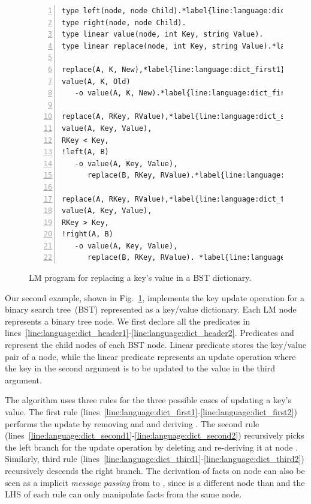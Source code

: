 
\begin{figure}[ht]
\begin{Verbatim}[numbers=left,fontsize=\codesize,commandchars=\*\{\}]
type left(node, node Child).*label{line:language:dict_header1}*hfill // Predicate declaration
type right(node, node Child).
type linear value(node, int Key, string Value).
type linear replace(node, int Key, string Value).*label{line:language:dict_header2}

replace(A, K, New),*label{line:language:dict_first1}*hfill// Rule 1: we found our key
value(A, K, Old)
   -o value(A, K, New).*label{line:language:dict_first2}

replace(A, RKey, RValue),*label{line:language:dict_second1}*hfill// Rule 2: go left
value(A, Key, Value),
RKey < Key,
!left(A, B)
   -o value(A, Key, Value),
      replace(B, RKey, RValue).*label{line:language:dict_second2}

replace(A, RKey, RValue),*label{line:language:dict_third1}*hfill// Rule 3: go right
value(A, Key, Value),
RKey > Key,
!right(A, B)
   -o value(A, Key, Value),
      replace(B, RKey, RValue). *label{line:language:dict_third2}
\end{Verbatim}
\caption{LM program for replacing a key's value in a BST dictionary.}
\label{code:language:btree_replace}
\end{figure}

Our second example, shown in Fig.~\ref{code:language:btree_replace}, implements
the key update operation for a binary search tree~(BST) represented as a
key/value dictionary. Each LM node represents a binary tree node. We first
declare all the predicates in
lines~\ref{line:language:dict_header1}-\ref{line:language:dict_header2}.
Predicates  and  represent the child nodes of each BST
node. Linear predicate  stores the key/value pair of a node, while
the linear predicate  represents an update operation where the key
in the second argument is to be updated to the value in the third argument.

The algorithm uses three rules for the three possible cases of updating a key's
value. The first rule
(lines~\ref{line:language:dict_first1}-\ref{line:language:dict_first2}) performs
the update by removing  and  and
deriving . The second rule
(lines~\ref{line:language:dict_second1}-\ref{line:language:dict_second2})
recursively picks the left branch for the update operation by deleting
 and re-deriving it at node . Similarly,
third rule
(lines~\ref{line:language:dict_third1}-\ref{line:language:dict_third2})
recursively descends the right branch. The derivation of  facts on
node  can also be seen as a implicit \emph{message passing} from
 to , since  is a different node than  and the
LHS of each rule can only manipulate facts from the same node.

